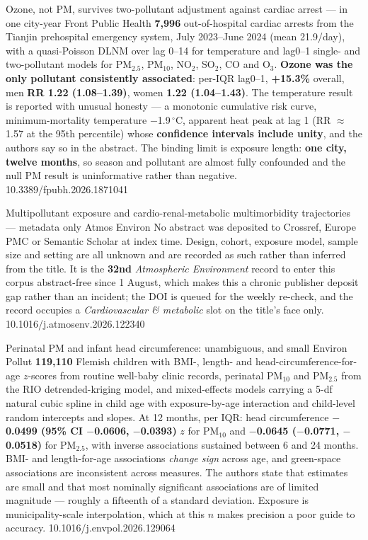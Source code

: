 \documentclass[10pt]{article}
\begin{document}
{Ozone, not PM, survives two-pollutant adjustment against cardiac arrest --- in one city-year}
{Front Public Health}
{\textbf{7{,}996} out-of-hospital cardiac arrests from the Tianjin prehospital emergency
system, July 2023--June 2024 (mean 21.9/day), with a quasi-Poisson DLNM over lag 0--14 for
temperature and lag0--1 single- and two-pollutant models for PM$_{2.5}$, PM$_{10}$,
NO$_2$, SO$_2$, CO and O$_3$. \textbf{Ozone was the only pollutant consistently
associated}: per-IQR lag0--1, \textbf{+15.3\%} overall, men \textbf{RR 1.22 (1.08--1.39)},
women \textbf{1.22 (1.04--1.43)}. The temperature result is reported with unusual honesty
--- a monotonic cumulative risk curve, minimum-mortality temperature $-$1.9\,$^\circ$C,
apparent heat peak at lag 1 (RR $\approx$1.57 at the 95th percentile) whose
\textbf{confidence intervals include unity}, and the authors say so in the abstract. The
binding limit is exposure length: \textbf{one city, twelve months}, so season and pollutant
are almost fully confounded and the null PM result is uninformative rather than negative.}
{10.3389/fpubh.2026.1871041}

{Multipollutant exposure and cardio-renal-metabolic multimorbidity trajectories --- metadata only}
{Atmos Environ}
{No abstract was deposited to Crossref, Europe PMC or Semantic Scholar at index time.
Design, cohort, exposure model, sample size and setting are all unknown and are recorded
as such rather than inferred from the title. It is the \textbf{32nd}
\textit{Atmospheric Environment} record to enter this corpus abstract-free since 1 August,
which makes this a chronic publisher deposit gap rather than an incident; the DOI is
queued for the weekly re-check, and the record occupies a
\textit{Cardiovascular \& metabolic} slot on the title's face only.}
{10.1016/j.atmosenv.2026.122340}


{Perinatal PM and infant head circumference: unambiguous, and small}
{Environ Pollut}
{\textbf{119{,}110} Flemish children with BMI-, length- and head-circumference-for-age
$z$-scores from routine well-baby clinic records, perinatal PM$_{10}$ and PM$_{2.5}$ from
the RIO detrended-kriging model, and mixed-effects models carrying a 5-df natural cubic
spline in child age with exposure-by-age interaction and child-level random intercepts and
slopes. At 12 months, per IQR: head circumference \textbf{$-$0.0499 (95\% CI $-$0.0606,
$-$0.0393)} $z$ for PM$_{10}$ and \textbf{$-$0.0645 ($-$0.0771, $-$0.0518)} for PM$_{2.5}$,
with inverse associations sustained between 6 and 24 months. BMI- and length-for-age
associations \emph{change sign} across age, and green-space associations are inconsistent
across measures. The authors state that estimates are small and that most nominally
significant associations are of limited magnitude --- roughly a fifteenth of a standard
deviation. Exposure is municipality-scale interpolation, which at this $n$ makes precision
a poor guide to accuracy.}
{10.1016/j.envpol.2026.129064}
\end{document}
